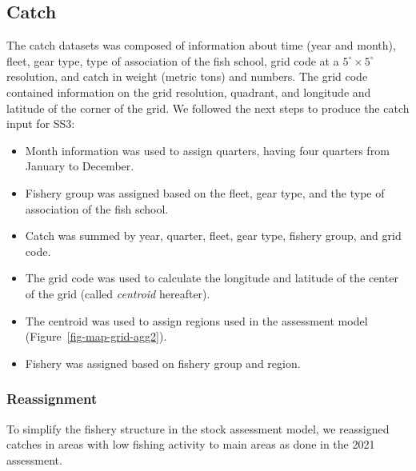 \documentclass[
]{scrartcl}
\providecommand{\tightlist}{%
  \setlength{\itemsep}{0pt}\setlength{\parskip}{0pt}}\usepackage{longtable,booktabs,array}
\begin{document}
\subsection{Catch}\label{catch}

The catch datasets was composed of information about time (year and
month), fleet, gear type, type of association of the fish school, grid
code at a \(5^\circ\times 5^\circ\) resolution, and catch in weight
(metric tons) and numbers. The grid code contained information on the
grid resolution, quadrant, and longitude and latitude of the corner of
the grid. We followed the next steps to produce the catch input for SS3:

\begin{itemize}
\tightlist
\item
  Month information was used to assign quarters, having four quarters
  from January to December.
\item
  Fishery group was assigned based on the fleet, gear type, and the type
  of association of the fish school.
\item
  Catch was summed by year, quarter, fleet, gear type, fishery group,
  and grid code.
\item
  The grid code was used to calculate the longitude and latitude of the
  center of the grid (called \emph{centroid} hereafter).
\item
  The centroid was used to assign regions used in the assessment model
  (Figure~\ref{fig-map-grid-agg2}).
\item
  Fishery was assigned based on fishery group and region.
\end{itemize}

\subsubsection{Reassignment}\label{sec-catchreassign}

To simplify the fishery structure in the stock assessment model, we
reassigned catches in areas with low fishing activity to main areas as
done in the 2021 assessment.
\end{document}
